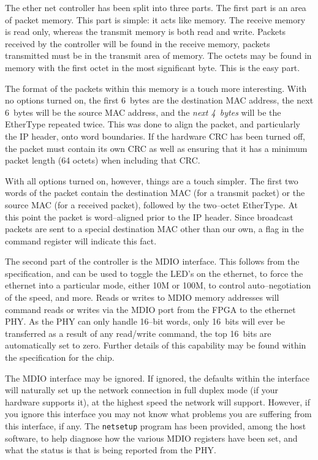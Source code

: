 \documentclass{gqtekspec}
\begin{document}
The ether net controller has been split into three parts.  The first part is
an area of packet memory.  This part is simple: it acts like memory.  The
receive memory is read only, whereas the transmit memory is both read and
write.  Packets received by the controller will be found in the receive memory,
packets transmitted must be in the transmit area of memory.  The octets
may be found in memory with the first octet in the most significant byte.
This is the easy part.

The format of the packets within this memory is a touch more interesting.
With no options turned on, the first 6~bytes are the destination MAC
address, the next 6~bytes will be the source MAC address, and the {\em next
4~bytes} will be the EtherType repeated twice.  This was done to align the
packet, and particularly the IP header, onto word boundaries.  If the hardware
CRC has been turned off, the packet must contain its own CRC as well as
ensuring that it has a minimum packet length (64 octets) when including that
CRC.

With all options turned on, however, things are a touch simpler.  The first
two words of the packet contain the destination MAC (for a transmit packet)
or the source MAC (for a received packet), followed by the two--octet
EtherType.  At this point the packet is word--aligned prior to the IP header.
Since broadcast packets are sent to a special destination MAC other than
our own, a flag in the command register will indicate this fact.


The second part of the controller is the MDIO interface.  This follows from
the specification, and can be used to toggle the LED's on the ethernet,
to force the ethernet into a particular mode, either 10M or 100M, to control
auto--negotiation of the speed, and more.  Reads or writes to MDIO memory
addresses will command reads or writes via the MDIO port from the FPGA to the
ethernet PHY.  As the PHY can only handle 16--bit words, only 16~bits will
ever be transferred as a result of any read/write command, the top 16~bits
are automatically set to zero.  Further details of this capability may be
found within the specification for the chip.

The MDIO interface may be ignored.  If ignored, the defaults within the
interface will naturally set up the network connection in full duplex mode (if
your hardware supports it), at the highest speed the network will support.  
However, if you ignore this interface you may not know what problems you are
suffering from this interface, if any.  The {\tt netsetup} program has been
provided, among the host software, to help diagnose how the various MDIO
registers have been set, and what the status is that is being reported from
the PHY.
\end{document}
